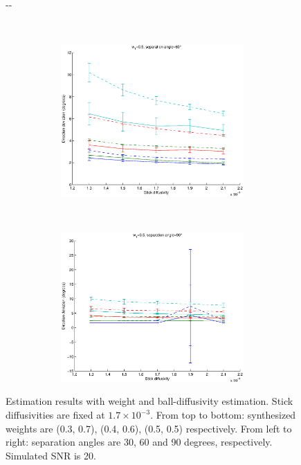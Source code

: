 \documentclass{article}
\begin{document}
\begin{figure}[H]
\begin{adjustwidth}{-\oddsidemargin}{-\rightmargin}
\begin{subfigure}{0.8\paperwidth}
\begin{subfigure}{0.3\textwidth}
      \end{subfigure}
      ~
      \begin{subfigure}{0.3\textwidth}
        \centering
        \includegraphics[width=\textwidth]{figures/synth_modbas_weights__snr=20__w1=5__angle=60.eps}
      \end{subfigure}
      ~
      \begin{subfigure}{0.3\textwidth}
        \centering
        \includegraphics[width=\textwidth]{figures/synth_modbas_weights__snr=20__w1=5__angle=90.eps}
      \end{subfigure}
    \end{subfigure}
  \end{adjustwidth}
  
  \caption{Estimation results with weight and ball-diffusivity estimation. Stick diffusivities are fixed at $1.7\times 10^{-3}$. From top to bottom: synthesized weights are (0.3, 0.7), (0.4, 0.6), (0.5, 0.5) respectively. From left to right: separation angles are 30, 60 and 90 degrees, respectively. Simulated SNR is 20.}
\end{figure}
\end{document}

